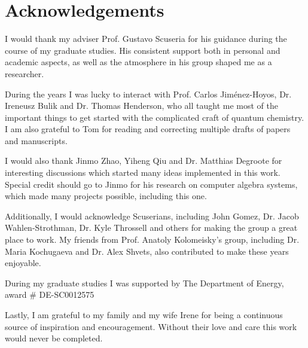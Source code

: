 \section*{Acknowledgements}

I would thank my adviser Prof. Gustavo Scuseria for his guidance 
during the course of my graduate studies. His consistent support both in 
personal and academic aspects, as well as the atmosphere in his group shaped me 
as a researcher. 

During the years I was lucky to interact with Prof. Carlos 
Jim{\'e}nez-Hoyos, Dr. Ireneusz Bulik and Dr. Thomas Henderson,
who all taught me most of the important things to get started with the 
complicated craft of quantum chemistry. I am also grateful to Tom for reading 
and correcting multiple drafts of papers and manuscripts.

I would also thank Jinmo Zhao, Yiheng Qiu and Dr. Matthias Degroote for 
interesting discussions which started many ideas implemented in this work.
Special credit should go to Jinmo for his research on computer algebra 
systems, which made many projects possible, including this one.

Additionally, I would acknowledge Scuserians, including John Gomez, Dr. Jacob
Wahlen-Strothman, Dr. Kyle Throssell and others for making the group a great
place to work. My friends from Prof. Anatoly Kolomeisky's group, including 
Dr. Maria Kochugaeva and Dr. Alex Shvets, also contributed to make these 
years enjoyable.

During my graduate studies I was supported by The Department of Energy, award 
\# DE-SC0012575

Lastly, I am grateful to my family and my wife Irene for being a 
continuous source of inspiration and encouragement. Without their love and 
care this work would never be completed.